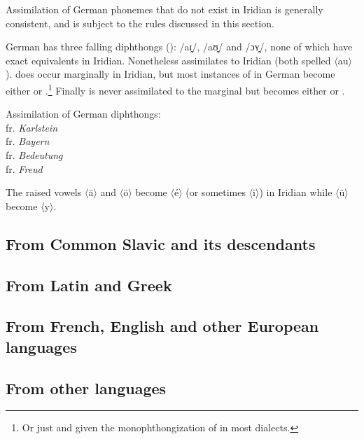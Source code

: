 Assimilation of German phonemes that do not exist in Iridian is generally consistent, and is subject to the rules discussed in this section.

German has three falling diphthongs (\cite{wiese1996}): /aɪ̯/, /aʊ̯/ and /ɔʏ̯/, none of which have exact equivalents in Iridian. Nonetheless  assimilates to Iridian  (both spelled $\langle$au$\rangle$).  does occur marginally in Iridian, but most instances of  in German become either  or .\footnote{Or just  and  given the monophthongization of  in most dialects.} Finally  is never assimilated to the marginal  but becomes either  or .


\ex
Assimilation of German diphthongs:\\
 fr. \emph{Karlstein}\\
 fr. \emph{Bayern}\\
 fr. \emph{Bedeutung}\\
 fr. \emph{Freud}
\xe

The raised vowels $\langle$\"a$\rangle$ and $\langle$\"o$\rangle$ become  $\langle$é$\rangle$ (or sometimes  $\langle$i$\rangle$) in Iridian while $\langle$\"u$\rangle$ become  $\langle$y$\rangle$.


\subsection{From Common Slavic and its descendants}

\subsection{From Latin and Greek}

\subsection{From French, English and other European languages}

\subsection{From other languages}